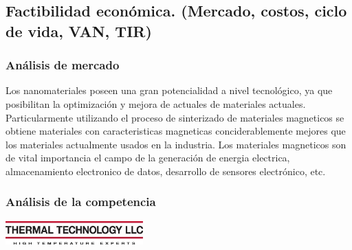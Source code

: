 
  \subsection{Factibilidad económica. (Mercado, costos, ciclo de vida, VAN, TIR)}  

  \subsubsection{Análisis de mercado}  

  Los nanomateriales poseen una gran potencialidad a nivel tecnológico, ya que posibilitan la optimización y mejora de actuales
  de materiales actuales.
  Particularmente utilizando el proceso de sinterizado de materiales magneticos se obtiene materiales
  con caracteristicas magneticas conciderablemente mejores que los materiales actualmente usados en la industria.
  Los materiales magneticos son de vital importancia el campo de la generación de energia electrica, almacenamiento electronico de datos, 
  desarrollo de sensores electrónico, etc.
  \newline

    \newpage

  \subsubsection{Análisis de la competencia}  

  \vspace{15px}
  \includegraphics[width=200px]{../../Documentacion/Diagramas/logo(1).jpg}
  \vspace{25px}

